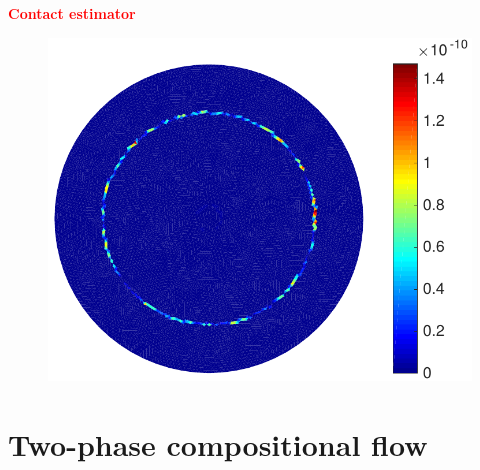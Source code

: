 \documentclass[aspectratio=169]{beamer}
\begin{document}
\begin{frame}
\hspace{5 cm}
\textcolor{red}{\textbf{Contact estimator}}
\begin{figure}
\includegraphics[width=0.6 \textwidth]{fig_article_chap_1/modif_fig_contact_estimator_hmax0,09_Dt0,001_tt180}  
\end{figure}
\end{frame}
%
\section{Two-phase compositional flow}
\end{document}
